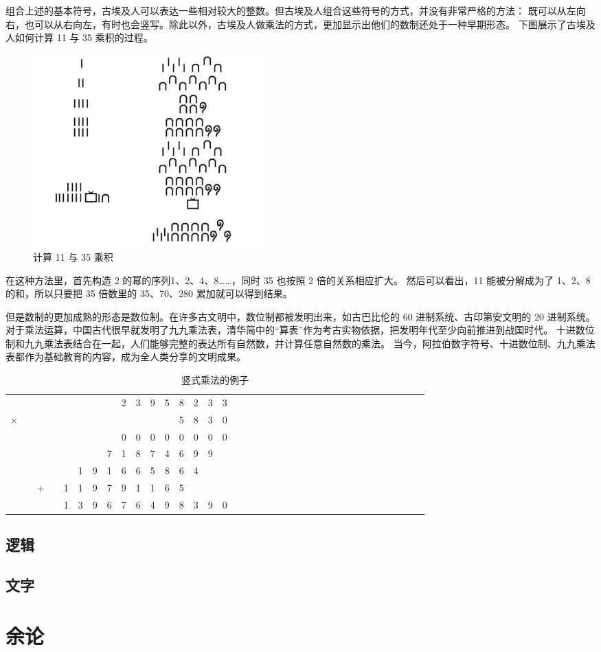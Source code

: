 \documentclass[a4paper,10.5pt]{article}
\begin{document}
组合上述的基本符号，古埃及人可以表达一些相对较大的整数。但古埃及人组合这些符号的方式，并没有非常严格的方法：
既可以从左向右，也可以从右向左，有时也会竖写。除此以外，古埃及人做乘法的方式，更加显示出他们的数制还处于一种早期形态。
下图展示了古埃及人如何计算 11 与 35 乘积的过程。

\begin{figure}[ht]
\centering
\includegraphics[width=3.5in]{images/ancient_egypt_multiplication.jpg}
\caption{计算 11 与 35 乘积}
\end{figure}

在这种方法里，首先构造 2 的幂的序列1、2、4、8……，同时 35 也按照 2 倍的关系相应扩大。
然后可以看出，11 能被分解成为了 1、2、8 的和，所以只要把 35 倍数里的 35、70、280 累加就可以得到结果。

但是数制的更加成熟的形态是数位制。在许多古文明中，数位制都被发明出来，如古巴比伦的 60 进制系统、古印第安文明的 20 进制系统。
对于乘法运算，中国古代很早就发明了九九乘法表，清华简中的“算表”作为考古实物依据，把发明年代至少向前推进到战国时代。
十进数位制和九九乘法表结合在一起，人们能够完整的表达所有自然数，并计算任意自然数的乘法。
当今，阿拉伯数字符号、十进数位制、九九乘法表都作为基础教育的内容，成为全人类分享的文明成果。

\begin{table}[tbhp]
\centering
\begin{tabular}{cccccccccccccccccccccccccccccccccccc}
  &   &   &   &   &   &   &   & 2 & 3 & 9 & 5 & 8 & 2 & 3 & 3\\
× &   &   &   &   &   &   &   &   &   &   &   & 5 & 8 & 3 & 0\\
\hline
  &   &   &   &   &   &   &   & 0 & 0 & 0 & 0 & 0 & 0 & 0 & 0\\
  &   &   &   &   &   &   & 7 & 1 & 8 & 7 & 4 & 6 & 9 & 9 &  \\
  &   &   &   &   & 1 & 9 & 1 & 6 & 6 & 5 & 8 & 6 & 4 &   &  \\
  &   & + &   & 1 & 1 & 9 & 7 & 9 & 1 & 1 & 6 & 5 &   &   &  \\
\hline
  &   &   &   & 1 & 3 & 9 & 6 & 7 & 6 & 4 & 9 & 8 & 3 & 9 & 0\\
\end{tabular}
\caption{竖式乘法的例子}
\end{table}

\subsection{逻辑}

\subsection{文字}

\section{余论}
\end{document}
